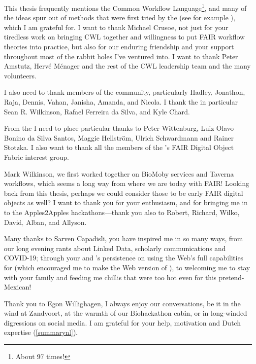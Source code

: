 This thesis frequently mentions the Common Workflow Language\footnote{About 97 times!}, and many of the ideas spur out of methods that were first tried by the  (see for example \cite{Möller 2017,Robinson 2017,Khan 2019,Crusoe 2022}), which I am grateful for. I want to thank Michael Crusoe, not just for your tiredless work on bringing CWL together and willingness to put FAIR workflow theories into practice, but also for our enduring friendship and your support throughout most of the rabbit holes I've ventured into. I want to thank Peter Amstutz, 
Hervé Ménager and the rest of the CWL leadership team and the many volunteers.

I also need to thank members of the  community, particularly Hadley, Jonathon, Raja, Dennis, Vahan, Janisha, Amanda, and Nicola. 
I thank the  in particular Sean R. Wilkinson, Rafael Ferreira da Silva, and Kyle Chard. 

From the  I need to place particular thanks to Peter Wittenburg, Luiz Olavo Bonino da Silva Santos, Maggie Hellström, Ulrich Schwardmann and Rainer Stotzka. I also want to thank all the members of the 's FAIR Digital Object Fabric interest group.

Mark Wilkinson, we first worked together on BioMoby services and Taverna workflows, which seems a long way from where we are today with FAIR! Looking back from this thesis, perhaps we could consider those to be early FAIR digital objects as well? I want to thank you for your enthusiasm,  and for bringing me in to the Apples2Apples hackathons---thank you also to Robert, Richard, Wilko, David, Alban, and Allyson.

Many thanks to Sarven Capadisli, you have inspired me in so many ways, from our long evening rants about Linked Data, scholarly communications and COVID-19; through your and 's persistence on using the Web's full capabilities for   (which encouraged me to make the Web version of ), to welcoming me to stay with your family and feeding me chillis that were too hot even for this pretend-Mexican!

Thank you to Egon Willighagen, I always enjoy our conversations, be it in the wind at Zandvoort, at the warmth of our Biohackathon cabin, or in long-winded digressions on social media. I am grateful for your help, motivation and Dutch expertise (\vref{summarynl}).

